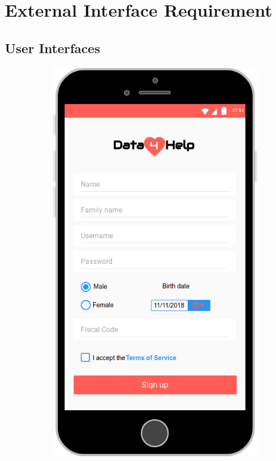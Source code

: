 \section{External Interface Requirement}
\subsection{User Interfaces}

\begin{figure}[ht]
    \centering
    \begin{subfigure}[t]{0.38\linewidth}
        \includegraphics[width=\linewidth]{images/Mock-up/Sign_Up_Page.png}

\end{subfigure}
\end{figure}
